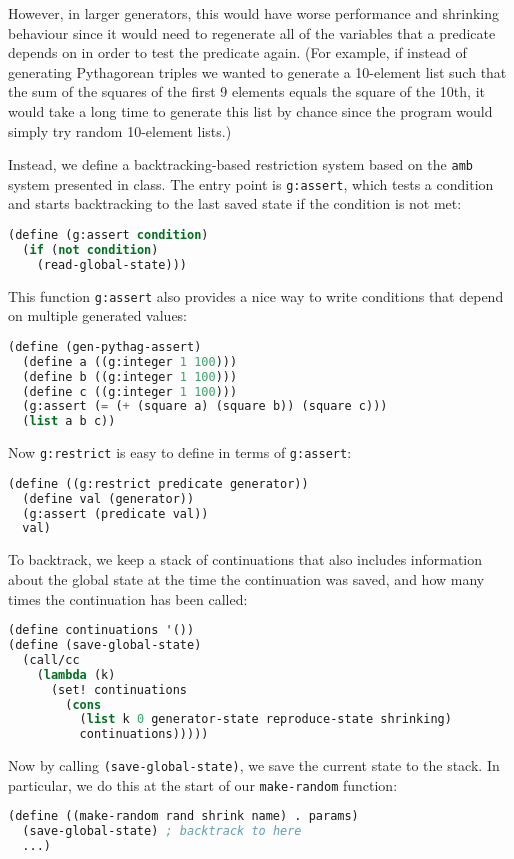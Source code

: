 However, in larger generators, this would have worse performance and shrinking behaviour since it would need to regenerate all of the variables that a predicate depends on in order to test the predicate again. (For example, if instead of generating Pythagorean triples we wanted to generate a 10-element list such that the sum of the squares of the first 9 elements equals the square of the 10th, it would take a long time to generate this list by chance since the program would simply try random 10-element lists.)

Instead, we define a backtracking-based restriction system based on the \verb|amb| system presented in class. The entry point is \verb|g:assert|, which tests a condition and starts backtracking to the last saved state if the condition is not met:

\begin{lstlisting}[language=lisp]
(define (g:assert condition)
  (if (not condition)
    (read-global-state)))
\end{lstlisting}

This function \verb|g:assert| also provides a nice way to write conditions that depend on multiple generated values:
\begin{lstlisting}[language=lisp]
(define (gen-pythag-assert)
  (define a ((g:integer 1 100)))
  (define b ((g:integer 1 100)))
  (define c ((g:integer 1 100)))
  (g:assert (= (+ (square a) (square b)) (square c)))
  (list a b c))
\end{lstlisting}

Now \verb|g:restrict| is easy to define in terms of \verb|g:assert|:
\begin{lstlisting}[language=lisp]
(define ((g:restrict predicate generator))
  (define val (generator))
  (g:assert (predicate val))
  val)
\end{lstlisting}

To backtrack, we keep a stack of continuations that also includes information about the global state at the time the continuation was saved, and how many times the continuation has been called:
\begin{lstlisting}[language=lisp]
(define continuations '())
(define (save-global-state)
  (call/cc
    (lambda (k)
      (set! continuations
        (cons
          (list k 0 generator-state reproduce-state shrinking)
          continuations)))))
\end{lstlisting}

Now by calling \verb|(save-global-state)|, we save the current state to the stack. In particular, we do this at the start of our \verb|make-random| function:
\begin{lstlisting}[language=lisp]
(define ((make-random rand shrink name) . params)
  (save-global-state) ; backtrack to here
  ...)
\end{lstlisting}

